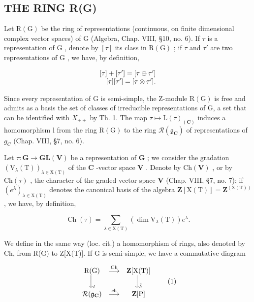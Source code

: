 \subsection{THE RING R(G)}

Let \(\mathrm{R}(\mathrm{G})\) be the ring of representations (continuous, on finite dimensional complex vector spaces) of \(\mathrm{G}\) (Algebra, Chap. VIII, §10, no. 6). If \(\tau\) is a representation of \(\mathrm{G}\) , denote by \([\tau]\) its class in \(\mathrm{R}(\mathrm{G})\) ; if \(\tau\) and \(\tau'\) are two representations of \(\mathrm{G}\) , we have, by definition,

\[
\begin{array}{r} [ \tau ] + [ \tau^ {\prime} ] = [ \tau \oplus \tau^ {\prime} ] \\ \relax [ \tau ] [ \tau^ {\prime} ] = [ \tau \otimes \tau^ {\prime} ]. \end{array}
\]

Since every representation of G is semi-simple, the Z-module \(\mathrm{R}(\mathrm{G})\) is free and admits as a basis the set of classes of irreducible representations of G, a set that can be identified with \(X_{++}\) by Th. 1. The map \(\tau \mapsto \mathrm{L}(\tau)_{(\mathbf{C})}\) induces a homomorphism l from the ring \(\mathrm{R}(\mathrm{G})\) to the ring \(\mathcal{R}(\mathfrak{g}_{\mathbf{C}})\) of representations of \(g_{C}\) (Chap. VIII, §7, no. 6).

Let \(\tau : \mathbf{G} \to \mathbf{GL}(\mathbf{V})\) be a representation of \(\mathbf{G}\) ; we consider the gradation \((\mathrm{V}_{\lambda}(\mathrm{T}))_{\lambda \in \mathrm{X}(\mathrm{T})}\) of the \(\mathbf{C}\) -vector space \(\mathbf{V}\) . Denote by \(\mathrm{Ch}(\mathbf{V})\) , or by \(\mathrm{Ch}(\tau)\) , the character of the graded vector space \(\mathbf{V}\) (Chap. VIII, §7, no. 7); if \((e^{\lambda})_{\lambda \in \mathrm{X}(\mathrm{T})}\) denotes the canonical basis of the algebra \(\mathbf{Z}[\mathrm{X}(\mathrm{T})] = \mathbf{Z}^{(\mathrm{X}(\mathrm{T}))}\) , we have, by definition,

\[
\operatorname{Ch} (\tau) = \sum_ {\lambda \in \mathrm{X} (\mathrm{T})} \left(\dim \mathrm{V} _ {\lambda} (\mathrm{T})\right) e ^ {\lambda}.
\]

We define in the same way (loc. cit.) a homomorphism of rings, also denoted by Ch, from R(G) to Z[X(T)]. If G is semi-simple, we have a commutative diagram

\[
\begin{array}{c c c} \mathrm{R(G)} & \stackrel {{\mathrm{Ch}}} {{\longrightarrow}} & \mathbf {Z} [ \mathrm{X(T)} ] \\ \Big \downarrow_ {l} & & \Big \downarrow_ {\tilde {\delta}} \\ \mathcal {R} (\mathfrak {g} _ {\mathbf {C}}) & \stackrel {{\mathrm{ch}}} {{\longrightarrow}} & \mathbf {Z} [ \mathrm{P} ] \end{array}\tag{1}
\]

